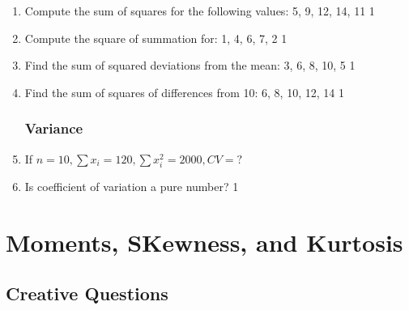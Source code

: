 \documentclass[a4paper,oneside]{book}
\begin{document}
\begin{enumerate}
\item Compute the sum of squares for the following values: 5, 9, 12, 14, 11 \hfill 1  

\item Compute the square of summation for: 1, 4, 6, 7, 2 \hfill 1  

\item Find the sum of squared deviations from the mean: 3, 6, 8, 10, 5 \hfill 1  

\item Find the sum of squares of differences from 10: 6, 8, 10, 12, 14 \hfill 1  



\subsection{Variance}
\item If $n=10, \sum x_i = 120, \sum x_i^2=2000, CV=?$
\item Is coefficient of variation a pure number? \hfill 1

\end{enumerate}


\chapter{Moments, SKewness, and Kurtosis} 
\section{Creative Questions}
\end{document}
